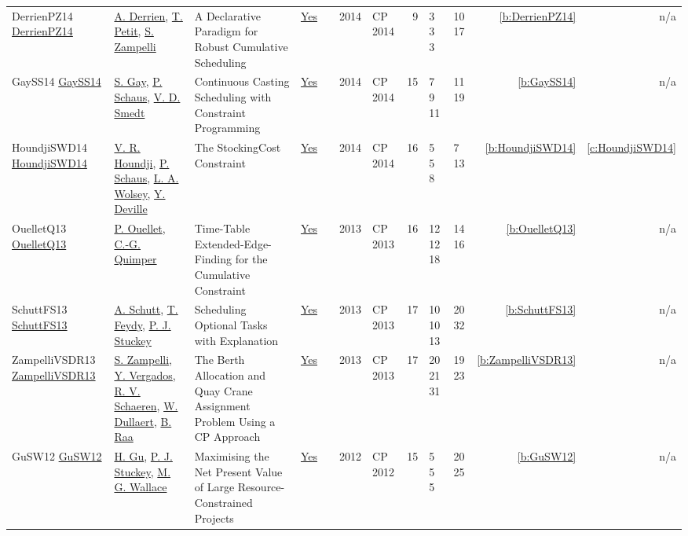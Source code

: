 {\begin{longtable}{>{\raggedright\arraybackslash}p{3cm}>{\raggedright\arraybackslash}p{4.5cm}>{\raggedright\arraybackslash}p{6.0cm}rrrp{2.5cm}rp{1cm}p{1cm}rr}
DerrienPZ14 \href{https://doi.org/10.1007/978-3-319-10428-7_23}{DerrienPZ14} & \hyperref[auth:a220]{A. Derrien}, \hyperref[auth:a221]{T. Petit}, \hyperref[auth:a222]{S. Zampelli} & \cellcolor{green!10}A Declarative Paradigm for Robust Cumulative Scheduling & \href{../works/DerrienPZ14.pdf}{Yes} & \cite{DerrienPZ14} & 2014 & CP 2014 & 9 & 3 3 3 & 10 17 & \ref{b:DerrienPZ14} & n/a\\
GaySS14 \href{https://doi.org/10.1007/978-3-319-10428-7_59}{GaySS14} & \hyperref[auth:a211]{S. Gay}, \hyperref[auth:a147]{P. Schaus}, \hyperref[auth:a237]{V. D. Smedt} & \cellcolor{green!10}Continuous Casting Scheduling with Constraint Programming & \href{../works/GaySS14.pdf}{Yes} & \cite{GaySS14} & 2014 & CP 2014 & 15 & 7 9 11 & 11 19 & \ref{b:GaySS14} & n/a\\
HoundjiSWD14 \href{https://doi.org/10.1007/978-3-319-10428-7_29}{HoundjiSWD14} & \hyperref[auth:a223]{V. R. Houndji}, \hyperref[auth:a147]{P. Schaus}, \hyperref[auth:a224]{L. A. Wolsey}, \hyperref[auth:a151]{Y. Deville} & \cellcolor{green!10}The StockingCost Constraint & \href{../works/HoundjiSWD14.pdf}{Yes} & \cite{HoundjiSWD14} & 2014 & CP 2014 & 16 & 5 5 8 & 7 13 & \ref{b:HoundjiSWD14} & \ref{c:HoundjiSWD14}\\
OuelletQ13 \href{https://doi.org/10.1007/978-3-642-40627-0_42}{OuelletQ13} & \hyperref[auth:a238]{P. Ouellet}, \hyperref[auth:a37]{C.-G. Quimper} & Time-Table Extended-Edge-Finding for the Cumulative Constraint & \href{../works/OuelletQ13.pdf}{Yes} & \cite{OuelletQ13} & 2013 & CP 2013 & 16 & 12 12 18 & 14 16 & \ref{b:OuelletQ13} & n/a\\
SchuttFS13 \href{https://doi.org/10.1007/978-3-642-40627-0_47}{SchuttFS13} & \hyperref[auth:a124]{A. Schutt}, \hyperref[auth:a154]{T. Feydy}, \hyperref[auth:a125]{P. J. Stuckey} & Scheduling Optional Tasks with Explanation & \href{../works/SchuttFS13.pdf}{Yes} & \cite{SchuttFS13} & 2013 & CP 2013 & 17 & 10 10 13 & 20 32 & \ref{b:SchuttFS13} & n/a\\
ZampelliVSDR13 \href{https://doi.org/10.1007/978-3-642-40627-0_64}{ZampelliVSDR13} & \hyperref[auth:a222]{S. Zampelli}, \hyperref[auth:a1207]{Y. Vergados}, \hyperref[auth:a1208]{R. V. Schaeren}, \hyperref[auth:a1209]{W. Dullaert}, \hyperref[auth:a1210]{B. Raa} & The Berth Allocation and Quay Crane Assignment Problem Using a {CP} Approach & \href{../works/ZampelliVSDR13.pdf}{Yes} & \cite{ZampelliVSDR13} & 2013 & CP 2013 & 17 & 20 21 31 & 19 23 & \ref{b:ZampelliVSDR13} & n/a\\
GuSW12 \href{https://doi.org/10.1007/978-3-642-33558-7_55}{GuSW12} & \hyperref[auth:a336]{H. Gu}, \hyperref[auth:a125]{P. J. Stuckey}, \hyperref[auth:a117]{M. G. Wallace} & Maximising the Net Present Value of Large Resource-Constrained Projects & \href{../works/GuSW12.pdf}{Yes} & \cite{GuSW12} & 2012 & CP 2012 & 15 & 5 5 5 & 20 25 & \ref{b:GuSW12} & n/a\\

\end{longtable}}
